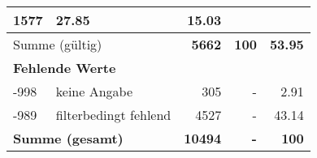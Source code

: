 \begin{longtable}{lXrrr}
       \num{1577} &
       \num[round-mode=places,round-precision=2]{27,85} &
         \num[round-mode=places,round-precision=2]{15,03} \\
     \midrule
     \multicolumn{2}{l}{Summe (gültig)} &
       \textbf{\num{5662}} &
     \textbf{100} &
       \textbf{\num[round-mode=places,round-precision=2]{53,95}} \\
     \multicolumn{5}{l}{\textbf{Fehlende Werte}}\\
       -998 &
       keine Angabe &
         \num{305} &
        - &
         \num[round-mode=places,round-precision=2]{2,91} \\
       -989 &
       filterbedingt fehlend &
         \num{4527} &
        - &
         \num[round-mode=places,round-precision=2]{43,14} \\
     \midrule
     \multicolumn{2}{l}{\textbf{Summe (gesamt)}} &
          \textbf{\num{10494}} &
        \textbf{-} &
        \textbf{100} \\
     \bottomrule
     \end{longtable}
     
